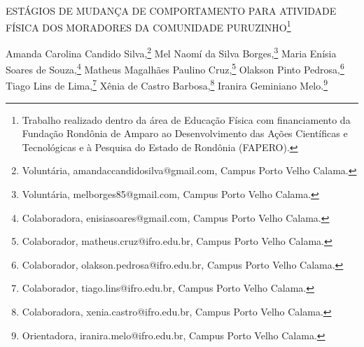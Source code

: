 \documentclass[article,12pt,onesidea,4paper,english,brazil]{abntex2}
\begin{document}
	
	
	\frenchspacing 
	
	\begin{center}
		\LARGE ESTÁGIOS DE MUDANÇA DE COMPORTAMENTO PARA ATIVIDADE FÍSICA DOS MORADORES DA COMUNIDADE PURUZINHO\footnote{Trabalho realizado dentro da área de Educação Física com financiamento da Fundação Rondônia de Amparo ao Desenvolvimento das Ações Científicas e Tecnológicas e à Pesquisa do Estado de Rondônia (FAPERO).}
		
		\normalsize
	Amanda Carolina Candido Silva,\footnote{Voluntária, amandaccandidosilva@gmail.com, Campus Porto Velho Calama.} 
	Mel Naomí da Silva Borges,\footnote{Voluntária, melborges85@gmail.com, Campus Porto Velho Calama.} 
		Maria Enísia Soares de Souza,\footnote{Colaboradora, enisiasoares@gmail.com, Campus Porto Velho Calama.} 
	Matheus Magalhães Paulino Cruz,\footnote{Colaborador, matheus.cruz@ifro.edu.br, Campus Porto Velho Calama.} 
		Olakson Pinto Pedrosa,\footnote{Colaborador, olakson.pedrosa@ifro.edu.br, Campus Porto Velho Calama.}
		Tiago Lins de Lima,\footnote{Colaborador, tiago.lins@ifro.edu.br, Campus Porto Velho Calama.}
		Xênia de Castro Barbosa,\footnote{Colaboradora, xenia.castro@ifro.edu.br, Campus Porto Velho Calama.}
		Iranira Geminiano Melo.\footnote{Orientadora, iranira.melo@ifro.edu.br, Campus Porto Velho Calama.}
		
	\end{center}
	
\end{document}
